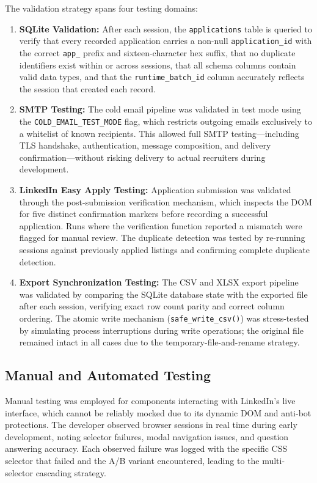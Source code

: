\documentclass[12pt, a4paper, oneside]{report}
\begin{document}
The validation strategy spans four testing domains:

\begin{enumerate}
    \item \textbf{SQLite Validation:} After each session, the \texttt{applications} table is queried to verify that every recorded application carries a non-null \texttt{application\_id} with the correct \texttt{app\_} prefix and sixteen-character hex suffix, that no duplicate identifiers exist within or across sessions, that all schema columns contain valid data types, and that the \texttt{runtime\_batch\_id} column accurately reflects the session that created each record.
    \item \textbf{SMTP Testing:} The cold email pipeline was validated in test mode using the \texttt{COLD\_EMAIL\_TEST\_MODE} flag, which restricts outgoing emails exclusively to a whitelist of known recipients. This allowed full SMTP testing---including TLS handshake, authentication, message composition, and delivery confirmation---without risking delivery to actual recruiters during development.
    \item \textbf{LinkedIn Easy Apply Testing:} Application submission was validated through the post-submission verification mechanism, which inspects the DOM for five distinct confirmation markers before recording a successful application. Runs where the verification function reported a mismatch were flagged for manual review. The duplicate detection was tested by re-running sessions against previously applied listings and confirming complete duplicate detection.
    \item \textbf{Export Synchronization Testing:} The CSV and XLSX export pipeline was validated by comparing the SQLite database state with the exported file after each session, verifying exact row count parity and correct column ordering. The atomic write mechanism (\texttt{safe\_write\_csv()}) was stress-tested by simulating process interruptions during write operations; the original file remained intact in all cases due to the temporary-file-and-rename strategy.
\end{enumerate}

\subsection{Manual and Automated Testing}

Manual testing was employed for components interacting with LinkedIn's live interface, which cannot be reliably mocked due to its dynamic DOM and anti-bot protections. The developer observed browser sessions in real time during early development, noting selector failures, modal navigation issues, and question answering accuracy. Each observed failure was logged with the specific CSS selector that failed and the A/B variant encountered, leading to the multi-selector cascading strategy.
\end{document}
